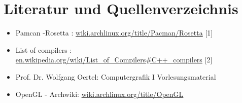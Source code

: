 \documentclass[12pt]{article}
\begin{document}
\section{Literatur und Quellenverzeichnis}
\begin{itemize}
	\item Pamcan -Rosetta : \url{wiki.archlinux.org/title/Pacman/Rosetta} \label{sec:pacman} [1]
	\item List of compilers : \url{en.wikipedia.org/wiki/List_of_Compilers#C++_compilers} \label{sec:comp} [2]
	\item Prof. Dr. Wolfgang Oertel: Computergrafik I Vorlesungsmaterial
	\item OpenGL - Archwiki: \url{wiki.archlinux.org/title/OpenGL}
\end{itemize}
\end{document}
